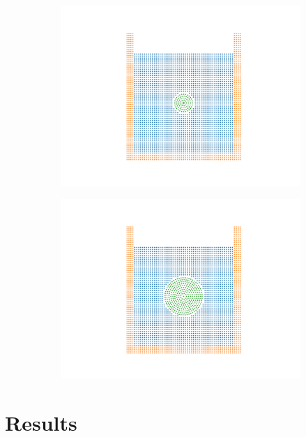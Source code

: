 \documentclass[preprint,12pt]{elsarticle}
\begin{document}
\begin{figure}[!htpb]
  \begin{subfigure}{0.48\textwidth}
    \centering
    \includegraphics[width=1.0\textwidth]{images/hs_tank_with_spherical_particles_sph_0_3}
    \label{fig:1-mixing-1-c}
  \end{subfigure}
  \begin{subfigure}{0.48\textwidth}
    \centering
    \includegraphics[width=1.0\textwidth]{images/hs_tank_with_spherical_particles_sph_0_6}
    \label{fig:1-mixing-1-c}
  \end{subfigure}
  \caption{}
\label{fig:xxxx}
\end{figure}


\FloatBarrier%
\section{Results}
\end{document}
